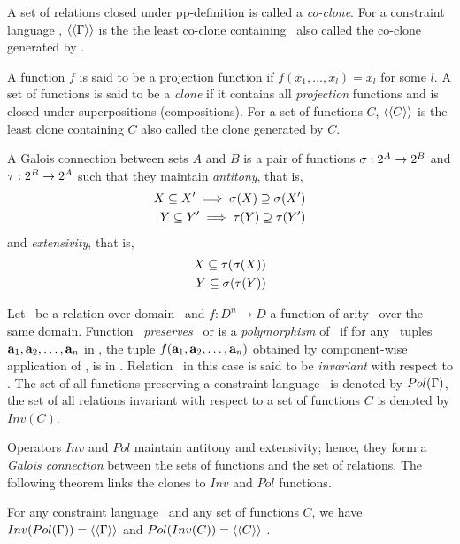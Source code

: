 A set of relations closed under pp-definition is called a \emph{co-clone}.
For a constraint language \mrelset, \(\langle\langle \Gamma \rangle\rangle\) is the the least co-clone containing
\mrelset\ also called the co-clone generated by \mrelset\@.

A function \(f\) is said to be a projection function if \(f(x_1,\dotsc,x_l)=x_l\) 
for some \(l\)\@.
A set of functions is said to be a \emph{clone} if it contains all \emph{projection}
functions and is closed under superpositions (compositions). For a set of functions
\(C\), \(\langle\langle C \rangle\rangle\) is the least clone containing \(C\) also called the clone generated by \(C\)\@.

A Galois connection between sets \(A\) and \(B\) is a pair of functions
\(\sigma:2^{A} \to 2^{B}\) and \(\tau:2^{B} \to 2^{A}\) 
such that they maintain {\em antitony}, that is,
\begin{align*}
X \subseteq X' \implies \sigma(X) \supseteq \sigma(X') \\
Y \subseteq Y' \implies \tau(Y) \supseteq \tau(Y') \\
\end{align*}
and {\em extensivity}, that is,
\begin{align*}
X \subseteq \tau(\sigma(X)) \\
Y \subseteq \sigma(\tau(Y))
\end{align*}

Let \mR\ be a relation over domain \mD\ and \(f:D^n\to D\) a function of arity \mn\ over the
same domain. Function \mf\ \emph{preserves} \mR\ or is a \emph{polymorphism} of \mR\ if
for any \mn\ tuples \(\textbf{a}_1,\textbf{a}_2,\dotsc,\textbf{a}_n\) in \mR, the tuple
\(f(\textbf{a}_1,\textbf{a}_2,\dotsc,\textbf{a}_n)\) obtained by component-wise application of \mf,
is in \mR\@. Relation \mR\ in this case is said to be \emph{invariant} with respect 
to \mf\@.
The set of all functions preserving a constraint language \mrelset\ is 
denoted by \(Pol(\Gamma)\), the set of all relations invariant with respect to a set of
functions  \(C\) is denoted by \(Inv(C)\)\@.

Operators \(Inv\) and \(Pol\) maintain antitony and extensivity; hence, they 
form a \emph{Galois connection} between the sets of functions 
and the set of relations. The following theorem links the clones to \(Inv\) and \(Pol\)
functions.

\begin{theorem}
For any constraint language \mrelset\ and 
any set of functions \(C\), 
we have \(Inv(Pol(\Gamma))=\langle\langle \Gamma \rangle\rangle\)
and
\(Pol(Inv(C))=\langle\langle C \rangle\rangle\)
\@.
\end{theorem}

